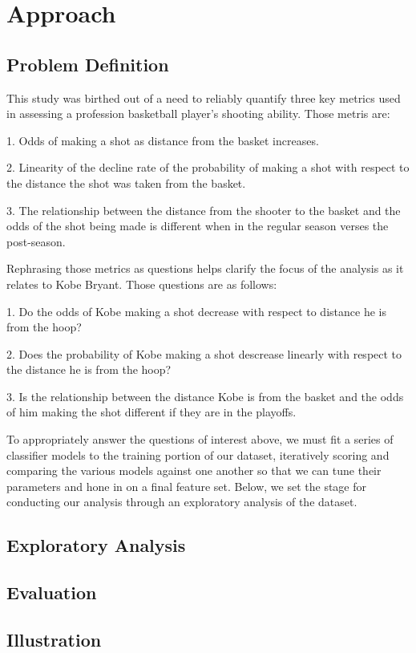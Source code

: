 \chapter{Approach}\label{chap:approach}


\section{Problem Definition}
This study was birthed out of a need to reliably quantify three key metrics used in assessing a profession basketball player's shooting ability.  Those metris are:

1. Odds of making a shot as distance from the basket increases.

2. Linearity of the decline rate of the probability of making a shot with respect to the distance the shot was taken from the basket.

3. The relationship between the distance from the shooter to the basket and the odds of the shot being made is different when in the regular season verses the post-season.

Rephrasing those metrics as questions helps clarify the focus of the analysis as it relates to Kobe Bryant.
Those questions are as follows:

1. Do the odds of Kobe making a shot decrease with respect to distance he is from the hoop?

2. Does the probability of Kobe making a shot descrease linearly with respect to the distance he is from the hoop?

3. Is the relationship between the distance Kobe is from the basket and the odds of him making the shot different if they are in the playoffs.


To appropriately answer the questions of interest above, we must fit a series of classifier models to the training portion of our dataset, iteratively scoring and comparing the various models against one another so that we can tune their parameters and hone in on a final feature set.
Below, we set the stage for conducting our analysis through an exploratory analysis of the dataset.


\section{Exploratory Analysis}






\section{Evaluation}

\section{Illustration}

